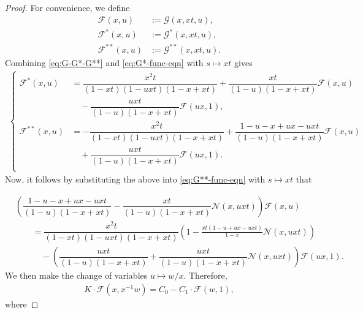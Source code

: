 \documentclass[reqno]{amsart}
\numberwithin{equation}{section}
\theoremstyle{plain}
\theoremstyle{definition}
\theoremstyle{named}
\newcommand{\cN}{\mathcal{N}}
\newcommand{\cG}{\mathcal{G}}
\newcommand{\cF}{\mathcal{F}}
\begin{document}
\begin{proof}
	For convenience, we define
	\begin{align*}
		\cF(x,u)&:=\cG(x,xt,u),\\
		\cF^*(x,u)&:=\cG^*(x,xt,u),\\
		\cF^{**}(x,u)&:=\cG^{**}(x,xt,u).
	\end{align*}
	Combining \eqref{eq:G-G*-G**} and \eqref{eq:G*-func-eqn} with $s\mapsto xt$ gives
	\begin{align*}
		\left\{\begin{aligned}
			\cF^*(x,u)&=\dfrac{x^2t}{(1-xt)(1-uxt)(1-x+xt)}+\dfrac{xt}{(1-u)(1-x+xt)}\cF(x,u)\\
			&\quad-\dfrac{uxt}{(1-u)(1-x+xt)}\cF(ux,1),\\[12pt]
			\cF^{**}(x,u)&=-\dfrac{x^2t}{(1-xt)(1-uxt)(1-x+xt)}+\dfrac{1-u-x+ux-uxt}{(1-u)(1-x+xt)}\cF(x,u)\\
			&\quad+\dfrac{uxt}{(1-u)(1-x+xt)}\cF(ux,1).\\
		\end{aligned}\right.
	\end{align*}
	Now, it follows by substituting the above into \eqref{eq:G**-func-eqn} with $s\mapsto xt$ that








	\begin{align*}
		&\left(\dfrac{1-u-x+ux-uxt}{(1-u)(1-x+xt)}-\dfrac{xt}{(1-u)(1-x+xt)}\cN(x,uxt)\right)\cF(x,u)\\
		&\qquad=\dfrac{x^2t}{(1-xt)(1-uxt)(1-x+xt)}\left(1-\frac{xt(1-u+ux-uxt)}{1-x}\cN(x,uxt)\right)\\
		&\qquad\quad-\left(\dfrac{uxt}{(1-u)(1-x+xt)}+\dfrac{uxt}{(1-u)(1-x+xt)}\cN(x,uxt)\right)\cF(ux,1).
	\end{align*}
	We then make the change of variables $u\mapsto w/x$. Therefore,
	\begin{align}\label{eq:F-kernel}
		K\cdot \cF(x,x^{-1}w)=C_0-C_1\cdot \cF(w,1),
	\end{align}
	where









\end{proof}
\end{document}
